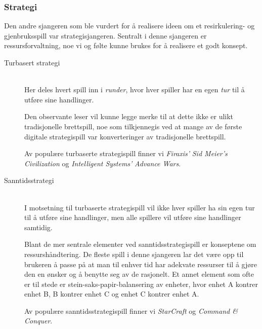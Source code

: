 


\subsubsection{Strategi}\label{sec:strategispill}
Den andre sjangeren som ble vurdert for å realisere ideen om et resirkulering- og gjenbruksspill var strategisjangeren. Sentralt i denne sjangeren er ressursforvaltning, noe vi og følte kunne brukes for å realisere et godt konsept.

\begin{description}

	\item[Turbasert strategi] \hfill \\
	Her deles hvert spill inn i \emph{runder}, hvor hver spiller har en egen \emph{tur} til å utføre sine handlinger.


	Den observante leser vil kunne legge merke til at dette ikke er ulikt tradisjonelle brettspill, noe som tilkjennegis ved at mange av de første digitale strategispill var konverteringer av tradisjonelle brettspill.

	Av populære turbaserte strategispill finner vi \emph{Firaxis'} \emph{Sid Meier's Civilization} og \emph{Intelligent Systems'} \emph{Advance Wars}. %


	\item[Sanntidsstrategi] \hfill \\
	
I motsetning til turbaserte strategispill vil ikke hver spiller ha sin egen tur til å utføre sine handlinger, men alle spillere vil utføre sine handlinger samtidig.

Blant de mer sentrale elementer ved sanntidsstrategispill er konseptene om ressurshåndtering. De fleste spill i denne sjangeren lar det være opp til brukeren å passe på at man til enhver tid har adekvate ressurser til å gjøre den en ønsker og å benytte seg av de rasjonelt. Et annet element som ofte er til stede er stein-saks-papir-balansering av enheter, hvor enhet A kontrer enhet B, B kontrer enhet C og enhet C kontrer enhet A.

	Av populære sanntidsstrategispill finner vi \emph{StarCraft} og \emph{Command \& Conquer}.

\end{description}

